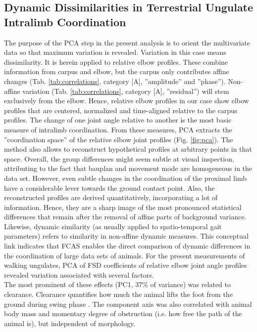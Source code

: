 \documentclass[10pt, a4paper]{article}
\begin{document}
\subsection{Dynamic Dissimilarities in Terrestrial Ungulate Intralimb Coordination}
The purpose of the PCA step in the present analysis is to orient the multivariate data so that maximum variation is revealed. 
Variation in this case means dissimilarity. 
It is herein applied to relative elbow profiles. 
These combine information from carpus and elbow, but the carpus only contributes affine changes (Tab. \ref{tab:correlations}, category [A], ''amplitude'' and ''phase'').  
Non-affine variation (Tab. \ref{tab:correlations}, category [A], ''residual'') will stem exclusively from the elbow. 
Hence, relative elbow profiles in our case show elbow profiles that are centered, normalized and time-aligned relative to the carpus profiles. 
The change of one joint angle relative to another is the most basic measure of intralimb coordination. 
From these measures, PCA extracts the ''coordination space'' of the relative elbow joint profiles (Fig. \ref{fig:pca}). 
The method also allows to reconstruct hypothetical profiles at arbitrary points in that space. 
Overall, the group differences might seem subtle at visual inspection, attributing to the fact that bauplan and movement mode are homogeneous in the data set. 
However, even subtle changes in the coordination of the proximal limb have a considerable lever towards the ground contact point. 
Also, the reconstructed profiles are derived quantitatively, incorporating a lot of information. 
Hence, they are a sharp image of the most pronounced statistical differences that remain after the removal of affine parts of background variance. 
Likewise, dynamic similarity (as usually applied to spatio-temporal gait parameters) refers to similarity in non-affine dynamic measures. 
This conceptual link indicates that FCAS enables the direct comparison of dynamic differences in the coordination of large data sets of animals. 
For the present measurements of walking ungulates, PCA of FSD coefficients of relative elbow joint angle profiles revealed variation associated with several factors. 
\medskip\\The most prominent of these effects (PC1, $37\%$ of variance) was related to clearance. 
Clearance quantifies how much the animal lifts the foot from the ground during swing phase \citep{Austin1999,MacLellan2010,Perrot2011}. 
The component axis was also correlated with animal body mass and momentary degree of obstruction (i.e. how free the path of the animal is), but independent of morphology. 
\end{document}
